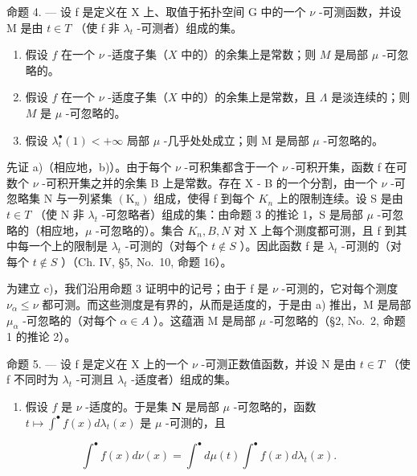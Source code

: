 命题 4. --- 设 f 是定义在 X 上、取值于拓扑空间 G 中的一个 \(\nu\) -可测函数，并设 M 是由 \(t \in T\) （使 f 非 \(\lambda_{t}\) -可测者）组成的集。

\begin{enumerate}
\def\labelenumi{\alph{enumi})}
\item
  假设 \(f\) 在一个 \(\nu\) -适度子集（\(X\) 中的）的余集上是常数；则 \(M\) 是局部 \(\mu\) -可忽略的。
\item
  假设 \(f\) 在一个 \(\nu\) -适度子集（\(X\) 中的）的余集上是常数，且 \(\Lambda\) 是淡连续的；则 \(M\) 是 \(\mu\) -可忽略的。
\item
  假设 \(\lambda_t^\bullet(1) < +\infty\) 局部 \(\mu\) -几乎处处成立；则 M 是局部 \(\mu\) -可忽略的。
\end{enumerate}

先证 a)（相应地，b)）。由于每个 \(\nu\) -可积集都含于一个 \(\nu\) -可积开集，函数 f 在可数个 \(\nu\) -可积开集之并的余集 B 上是常数。存在 X - B 的一个分割，由一个 \(\nu\) -可忽略集 N 与一列紧集 \((\mathrm{K}_{n})\) 组成，使得 f 到每个 \(K_{n}\) 上的限制连续。设 S 是由 \(t \in T\) （使 N 非 \(\lambda_{t}\) -可忽略者）组成的集：由命题 3 的推论 1，S 是局部 \(\mu\) -可忽略的（相应地，\(\mu\) -可忽略的）。集合 \(K_{n}, B, N\) 对 X 上每个测度都可测，且 f 到其中每一个上的限制是 \(\lambda_{t}\) -可测的（对每个 \(t \notin S\) ）。因此函数 f 是 \(\lambda_{t}\) -可测的（对每个 \(t \notin S\) ）（Ch. IV, §5, No.~10, 命题 16）。

为建立 c)，我们沿用命题 3 证明中的记号；由于 f 是 \(\nu\) -可测的，它对每个测度 \(\nu_{\alpha} \leqslant \nu\) 都可测。而这些测度是有界的，从而是适度的，于是由 a) 推出，M 是局部 \(\mu_{\alpha}\) -可忽略的（对每个 \(\alpha \in A\) ）。这蕴涵 M 是局部 \(\mu\) -可忽略的（§2, No.~2, 命题 1 的推论 2）。

命题 5. --- 设 f 是定义在 X 上的一个 \(\nu\) -可测正数值函数，并设 N 是由 \(t \in T\) （使 f 不同时为 \(\lambda_{t}\) -可测且 \(\lambda_{t}\) -适度者）组成的集。

\begin{enumerate}
\def\labelenumi{\alph{enumi})}
\tightlist
\item
  假设 \(f\) 是 \(\nu\) -适度的。于是集 \(\mathbf{N}\) 是局部 \(\mu\) -可忽略的，函数 \(t \mapsto \int^{\bullet} f(x) d\lambda_t(x)\) 是 \(\mu\) -可测的，且
\end{enumerate}

\[
\int^ {\bullet} f (x) d \nu (x) = \int^ {\bullet} d \mu (t) \int^ {\bullet} f (x) d \lambda_ {t} (x).\tag{9}
\]

